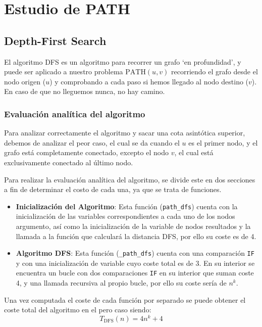 \section{Estudio de PATH}\label{sec:path}


\subsection{Depth-First Search}\label{subsec:dfs}
El algoritmo DFS\supercite{hopcroft1983data} es un algoritmo para recorrer un grafo `en profundidad', y puede ser aplicado a nuestro problema $\mathrm{PATH}(u,v)$ recorriendo el grafo desde el nodo origen ($u$) y comprobando a cada paso si hemos llegado al nodo destino ($v$). En caso de que no lleguemos nunca, no hay camino.

\subsubsection*{Evaluación analítica del algoritmo}
Para analizar correctamente el algoritmo y sacar una cota asintótica superior, debemos de analizar el peor caso, %
el cual se da cuando el $u$ es el primer nodo, y el grafo está completamente conectado, excepto el nodo $v$, el cual está exclusivamente conectado al último nodo.

Para realizar la evaluación  analítica del algoritmo, se divide este en dos secciones a fin de determinar el costo de cada una, ya que se trata de funciones.

\begin{itemize}
    \item \textbf{Inicialización del Algoritmo}: Esta función (\texttt{path\_dfs}) cuenta con la inicialización de las variables correspondientes a cada uno de los nodos argumento, así como la inicialización de la variable de nodos resultados y la llamada a la función que calculará la distancia DFS, por ello su coste es de 4.

    \item \textbf{Algoritmo DFS}: Esta función (\texttt{\_path\_dfs}) cuenta con una comparación \texttt{IF} y con una inicialización de variable cuyo coste total es de 3. En su interior se encuentra un bucle con dos comparaciones \texttt{IF} en su interior que suman coste 4, y una llamada recursiva al propio bucle, por ello su coste sería de $n^k$.
\end{itemize}

Una vez computada el coste de cada función por separado se puede obtener el coste total del algoritmo en el pero caso siendo:
\begin{equation}
    T_{\mathrm{DFS}}(n) = 4n^k+4
\end{equation}

